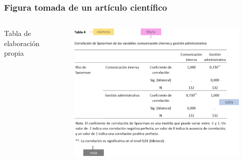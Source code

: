 \documentclass[
11pt, %
]{beamer}
\begin{document}
\begin{frame}
	\frametitle{Figura tomada de un artículo científico}

	\begin{columns}[c] %
		\begin{column}{0.5\textwidth} %
			Tabla de elaboración propia
		\end{column}
		\begin{column}{0.5\textwidth} %
			\begin{figure}
				\centering
				\includegraphics[width=1\linewidth]{images/screenshot021}
			\end{figure}

		\end{column}
	\end{columns}

\end{frame}
\end{document}

